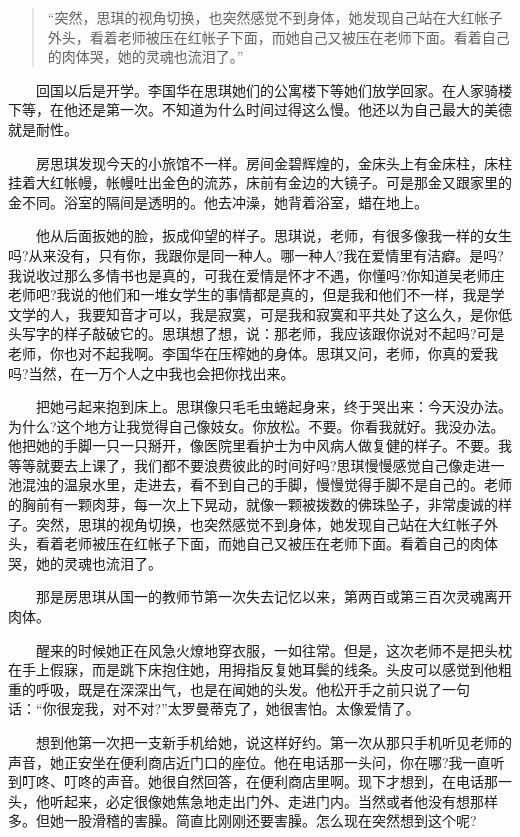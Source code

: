 \documentclass[12pt,UTF8]{ctexbook}
\begin{document}
\begin{quote}
\enquote{突然，思琪的视角切换，也突然感觉不到身体，她发现自己站在大红帐子外头，看着老师被压在红帐子下面，而她自己又被压在老师下面。看着自己的肉体哭，她的灵魂也流泪了。}
\end{quote}

　　回国以后是开学。李国华在思琪她们的公寓楼下等她们放学回家。在人家骑楼下等，在他还是第一次。不知道为什么时间过得这么慢。他还以为自己最大的美德就是耐性。

　　房思琪发现今天的小旅馆不一样。房间金碧辉煌的，金床头上有金床柱，床柱挂着大红帐幔，帐幔吐出金色的流苏，床前有金边的大镜子。可是那金又跟家里的金不同。浴室的隔间是透明的。他去冲澡，她背着浴室，蜡在地上。

　　他从后面扳她的脸，扳成仰望的样子。思琪说，老师，有很多像我一样的女生吗?从来没有，只有你，我跟你是同一种人。哪一种人?我在爱情里有洁癖。是吗?我说收过那么多情书也是真的，可我在爱情是怀才不遇，你懂吗?你知道吴老师庄老师吧?我说的他们和一堆女学生的事情都是真的，但是我和他们不一样，我是学文学的人，我要知音才可以，我是寂寞，可是我和寂寞和平共处了这么久，是你低头写字的样子敲破它的。思琪想了想，说：那老师，我应该跟你说对不起吗?可是老师，你也对不起我啊。李国华在压榨她的身体。思琪又问，老师，你真的爱我吗?当然，在一万个人之中我也会把你找出来。

　　把她弓起来抱到床上。思琪像只毛毛虫蜷起身来，终于哭出来：今天没办法。为什么?这个地方让我觉得自己像妓女。你放松。不要。你看我就好。我没办法。他把她的手脚一只一只掰开，像医院里看护士为中风病人做复健的样子。不要。我等等就要去上课了，我们都不要浪费彼此的时间好吗?思琪慢慢感觉自己像走进一池混浊的温泉水里，走进去，看不到自己的手脚，慢慢觉得手脚不是自己的。老师的胸前有一颗肉芽，每一次上下晃动，就像一颗被拨数的佛珠坠子，非常虔诚的样子。突然，思琪的视角切换，也突然感觉不到身体，她发现自己站在大红帐子外头，看着老师被压在红帐子下面，而她自己又被压在老师下面。看着自己的肉体哭，她的灵魂也流泪了。

　　那是房思琪从国一的教师节第一次失去记忆以来，第两百或第三百次灵魂离开肉体。

　　醒来的时候她正在风急火燎地穿衣服，一如往常。但是，这次老师不是把头枕在手上假寐，而是跳下床抱住她，用拇指反复她耳鬓的线条。头皮可以感觉到他粗重的呼吸，既是在深深出气，也是在闻她的头发。他松开手之前只说了一句话：\enquote{你很宠我，对不对?}太罗曼蒂克了，她很害怕。太像爱情了。

　　想到他第一次把一支新手机给她，说这样好约。第一次从那只手机听见老师的声音，她正安坐在便利商店近门口的座位。他在电话那一头问，你在哪?我一直听到叮咚、叮咚的声音。她很自然回答，在便利商店里啊。现下才想到，在电话那一头，他听起来，必定很像她焦急地走出门外、走进门内。当然或者他没有想那样多。但她一股滑稽的害臊。简直比刚刚还要害臊。怎么现在突然想到这个呢?
\end{document}
